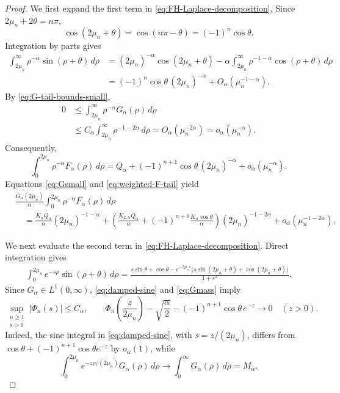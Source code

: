\documentclass[10pt,a4paper]{amsart}
\begin{document}
\begin{proof}
We first expand the first term in \eqref{eq:FH-Laplace-decomposition}.
Since $2\mu_n+2\theta=n\pi$,
\[
 \cos(2\mu_n+\theta)=\cos(n\pi-\theta)
 =(-1)^n\cos\theta.
\]
Integration by parts gives
\[
 \begin{aligned}
 \int_{2\mu_n}^\infty
 \rho^{-\alpha}\sin(\rho+\theta)\,d\rho&=(2\mu_n)^{-\alpha}\cos(2\mu_n+\theta)
 -\alpha\int_{2\mu_n}^\infty\rho^{-1-\alpha}
 \cos(\rho+\theta)\,d\rho\\
 &=(-1)^n\cos\theta\,(2\mu_n)^{-\alpha}
 +O_\alpha(\mu_n^{-1-\alpha}).
 \end{aligned}
\]
By \eqref{eq:G-tail-bounds-small},
\[
 \begin{aligned}
 0&\le\int_{2\mu_n}^\infty
 \rho^{-\alpha}G_\alpha(\rho)\,d\rho\\
 &\le C_\alpha\int_{2\mu_n}^\infty
 \rho^{-1-2\alpha}\,d\rho
 =O_\alpha(\mu_n^{-2\alpha})
 =o_\alpha(\mu_n^{-\alpha}).
 \end{aligned}
\]
Consequently,
\begin{equation}\label{eq:weighted-F-tail}
 \int_0^{2\mu_n}\rho^{-\alpha}F_\alpha(\rho)\,d\rho
 =Q_\alpha+(-1)^{n+1}\cos\theta\,(2\mu_n)^{-\alpha}
 +o_\alpha(\mu_n^{-\alpha}).
\end{equation}
Equations \eqref{eq:Gsmall} and \eqref{eq:weighted-F-tail} yield
\begin{equation}\label{eq:FH-first-part}
\begin{aligned}
 &\frac{G_\alpha(2\mu_n)}\alpha
 \int_0^{2\mu_n}\rho^{-\alpha}F_\alpha(\rho)\,d\rho\\
 &\quad=\frac{K_\alpha Q_\alpha}{\alpha}(2\mu_n)^{-1-\alpha}+\left(
 \frac{K_{2,\alpha}Q_\alpha}{\alpha}
 +(-1)^{n+1}\frac{K_\alpha\cos\theta}{\alpha}
 \right)(2\mu_n)^{-1-2\alpha}
 +o_\alpha(\mu_n^{-1-2\alpha}).
\end{aligned}
\end{equation}

We next evaluate the second term in \eqref{eq:FH-Laplace-decomposition}.
Direct integration gives
\begin{equation}\label{eq:damped-sine}
 \begin{aligned}
 \int_0^{2\mu_n}e^{-s\rho}\sin(\rho+\theta)\,d\rho
 =\frac{s\sin\theta+\cos\theta
 -e^{-2\mu_ns}\bigl(s\sin(2\mu_n+\theta)
 +\cos(2\mu_n+\theta)\bigr)}{1+s^2}.
 \end{aligned}
\end{equation}
Since $G_\alpha\in L^1(0,\infty)$, \eqref{eq:damped-sine} and
\eqref{eq:Gmass} imply
\begin{equation}\label{eq:Phi-bounds-limit}
 \sup_{\substack{n\ge1\\s>0}}|\Phi_n(s)|\le C_\alpha,
 \qquad
 \Phi_n\left(\frac z{2\mu_n}\right)
 -\sqrt{\frac\alpha2}
 -(-1)^{n+1}\cos\theta\,e^{-z}\longrightarrow0
 \quad(z>0).
\end{equation}
Indeed, the sine integral in \eqref{eq:damped-sine}, with
$s=z/(2\mu_n)$, differs from
$\cos\theta+(-1)^{n+1}\cos\theta e^{-z}$ by $o_\alpha(1)$, while
\[
 \int_0^{2\mu_n}e^{-z\rho/(2\mu_n)}G_\alpha(\rho)\,d\rho
 \longrightarrow\int_0^\infty G_\alpha(\rho)\,d\rho=M_\alpha.
\]


\end{proof}
\end{document}
